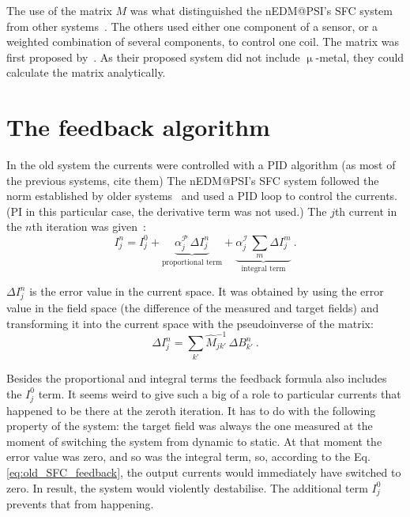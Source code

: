 The use of the matrix $M$ was what distinguished the nEDM@PSI's SFC system from other systems~\cite{Kelha1982,Brake1991,Spemann2003,Brys2005,Kobayashi2012,Voigt2013}. The others used either one component of a sensor, or a weighted combination of several components, to control one coil. The matrix was first proposed by~\cite{RetaHernandez1998}. As their proposed system did not include $\upmu$-metal, they could calculate the matrix analytically.



\section{The feedback algorithm}
In the old system the currents were controlled with a PID algorithm (as most of the previous systems, cite them)
The nEDM@PSI's SFC system followed the norm established by older systems~\cite{Kelha1982,Brake1991,Spemann2003,Brys2005}  and used a PID loop to control the currents. (PI in this particular case, the derivative term was not used.) The $j$th current in the $n$th iteration was given~\cite{Franke2013}:
\begin{equation}
  \label{eq:old_SFC_feedback}
  I^n_j = I^0_j +
    \underbrace{ \alpha^\mathcal{P}_j \, \Delta I^n_j }_\text{proportional term} +
    \underbrace{ \alpha^\mathcal{I}_j \, \sum_m \Delta I^m_j }_\text{integral term} \ .
\end{equation}

$\Delta I^n_j$ is the error value in the current space. It was obtained by using the error value in the field space (the difference of the measured and target fields) and transforming it into the current space with the pseudoinverse of the matrix:
\begin{equation}
  \Delta I^n_j = \sum_{k'} \hat{M}^{-1}_{jk'} \, \Delta B^n_{k'} \ .
\end{equation}

Besides the proportional and integral terms the feedback formula also includes the $I^0_j$ term. It seems weird to give such a big of a role to particular currents that happened to be there at the zeroth iteration. It has to do with the following property of the system: the target field was always the one measured at the moment of switching the system from dynamic to static.
At that moment the error value was zero, and so was the integral term, so, according to the Eq.\,\ref{eq:old_SFC_feedback}, the output currents would immediately have switched to zero. In result, the system would violently destabilise. The additional term $I^0_j$ prevents that from happening.



